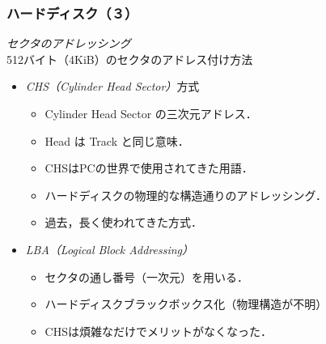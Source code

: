\documentclass[unicode,handout]{beamer}                   %
\begin{document}
\begin{frame}
  \frametitle{ハードディスク（３）}
  \emph{セクタのアドレッシング}\\
  512バイト（4KiB）のセクタのアドレス付け方法
  \vfill
  \begin{itemize}
  \item \emph{CHS（Cylinder Head Sector）}方式
    \begin{itemize}
    \item Cylinder Head Sector の三次元アドレス．
    \item Head は Track と同じ意味．
    \item CHSはPCの世界で使用されてきた用語．
    \item ハードディスクの物理的な構造通りのアドレッシング．
    \item 過去，長く使われてきた方式．
  \end{itemize}
  \vfill
  \item \emph{LBA（Logical Block Addressing）}
    \begin{itemize}
    \item セクタの通し番号（一次元）を用いる．
    \item ハードディスクブラックボックス化（物理構造が不明）
    \item CHSは煩雑なだけでメリットがなくなった．
    \end{itemize}
  \end{itemize}
  \vfill
\end{frame}
\end{document}
